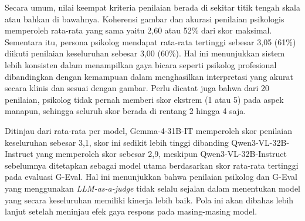 \newpage
Secara umum, nilai keempat kriteria penilaian berada di sekitar titik tengah skala atau bahkan di bawahnya. Koherensi gambar dan akurasi penilaian psikologis memperoleh rata-rata yang sama yaitu 2,60 atau 52\% dari skor maksimal. Sementara itu, persona psikolog mendapat rata-rata tertinggi sebesar 3,05 (61\%) diikuti penilaian keseluruhan sebesar 3,00 (60\%). Hal ini menunjukkan sistem lebih konsisten dalam menampilkan gaya bicara seperti psikolog profesional dibandingkan dengan kemampuan dalam menghasilkan interpretasi yang akurat secara klinis dan sesuai dengan gambar. Perlu dicatat juga bahwa dari 20 penilaian, psikolog tidak pernah memberi skor ekstrem (1 atau 5) pada aspek manapun, sehingga seluruh skor berada di rentang 2 hingga 4 saja.

Ditinjau dari rata-rata per model, Gemma-4-31B-IT memperoleh skor penilaian keseluruhan sebesar 3,1, skor ini sedikit lebih tinggi dibanding Qwen3-VL-32B-Instruct yang memperoleh skor sebesar 2,9, meskipun Qwen3-VL-32B-Instruct sebelumnya ditetapkan sebagai model utama berdasarkan skor rata-rata tertinggi pada evaluasi G-Eval. Hal ini menunjukkan bahwa penilaian psikolog dan G-Eval yang menggunakan \textit{LLM-as-a-judge} tidak selalu sejalan dalam menentukan model yang secara keseluruhan memiliki kinerja lebih baik. Pola ini akan dibahas lebih lanjut setelah meninjau efek gaya respons pada masing-masing model. 

